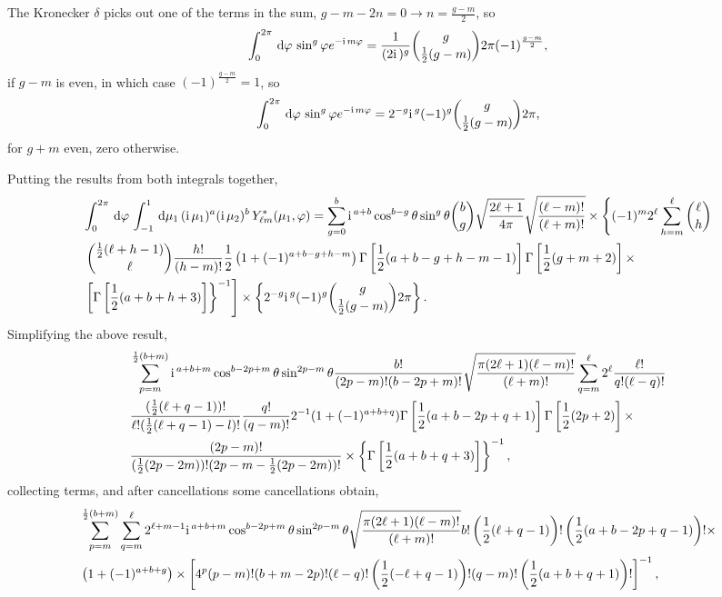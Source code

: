 The Kronecker \(\delta\) picks out one of the terms in the sum, \(g-m-2n=0 \to n = \frac{g-m}{2}\), so 
\begin{equation}
	\int_0^{2\pi} \,\mathrm{d}\varphi\, \sin^g \varphi e^{-\mathrm{i\,} m \varphi} = \frac{1}{(2 \mathrm{i\,} )^g} \binom{g}{\frac{1}{2}(g-m)} 2 \pi (-1)^{\frac{g-m}{2}},
\end{equation}
if \(g-m\) is even, in which case \((-1)^{\frac{g-m}{2}} = 1\), so
\begin{equation}
	\int_0^{2\pi} \,\mathrm{d}\varphi\, \sin^g \varphi e^{- \mathrm{i\,} m \varphi} = 2^{-g} \mathrm{i\,}^g (-1)^g \binom{g}{\frac{1}{2}(g-m)} 2 \pi, 
\end{equation}
for \(g+m \) even, zero otherwise. 

Putting the results from both integrals together, 
\begin{align}
	&\int_0^{2\pi} \,\mathrm{d}\varphi\, \int_{-1}^1 \,\mathrm{d}\mu_1\, (\mathrm{i\,} \mu_1)^a (\mathrm{i\,} \mu_2)^b \,Y_{\ell m}^*(\mu_1,\varphi) = \sum_{g=0}^b \mathrm{i\,}^{a+b} \cos^{b-g}\theta \sin^g\theta \binom{b}{g} \sqrt{\frac{2\ell+1}{4 \pi}} \sqrt{\frac{(\ell-m)!}{(\ell+m)!}} \times \left\{(-1)^m 2^\ell \sum_{h=m}^\ell \binom{\ell}{h} \right. \nonumber \\
	&\left. \binom{\frac{1}{2}(\ell+h-1)}{\ell} \frac{h!}{(h-m)!}  \frac{1}{2} \left(1+ (-1)^{a+b-g+h-m}\right) \Gamma\left[\frac{1}{2}(a+b-g+h-m-1)\right] \Gamma\left[\frac{1}{2} (g+m+2)\right]  \times \right. \nonumber \\
	&\left.  \left[\Gamma\left[\frac{1}{2} (a+b+h+3)\right] \right\}^{-1} \right]\times \left\{  2^{-g} \mathrm{i\,}^g (-1)^g \binom{g}{\frac{1}{2}(g-m)} 2 \pi\right\}.
\end{align}
Simplifying the above result,
\begin{align}
	&\sum_{p=m}^{\frac{1}{2}(b+m)} \mathrm{i\,}^{a+b+m} \cos^{b-2p+m}\theta \sin^{2p-m}\theta \frac{b!}{(2p-m)! (b-2p+m)!} \sqrt{\frac{\pi (2\ell+1) (\ell-m)!}{(\ell+m)!}} \sum_{q=m}^\ell 2^\ell \frac{\ell!}{q! (\ell-q)!} \nonumber \\
	& \frac{(\frac{1}{2}(\ell+q-1))!}{\ell!(\frac{1}{2}(\ell+q-1)-l)!} \frac{q!}{(q-m)!} 2^{-1} (1+(-1)^{a+b+q}) \Gamma\left[\frac{1}{2} (a+b-2p+q+1)\right] \Gamma\left[\frac{1}{2}(2p+2)\right]\times \nonumber \\
	& \frac{(2p-m)!}{(\frac{1}{2}(2p-2m))! (2p-m - \frac{1}{2}(2p-2m))!} \times \left\{ \Gamma\left[\frac{1}{2}(a+b+q+3)\right] \right\}^{-1},
\end{align}
collecting terms, and after cancellations some cancellations obtain, 
\begin{align}
	&\sum_{p=m}^{\frac{1}{2}(b+m)} \sum_{q=m}^\ell 2^{\ell+m-1} \mathrm{i\,}^{a+b+m} \cos^{b-2p+m}\theta \sin^{2p-m}\theta  \sqrt{\frac{\pi (2\ell+1) (\ell-m)!}{(\ell+m)!}} b! \left(\frac{1}{2}(\ell+q-1)\right)! \left(\frac{1}{2}(a+b-2p+q-1)\right)! \times \nonumber \\
	& \left(1+(-1)^{a+b+g}\right) \times \left[ 4^p (p-m)! (b+m-2p)! (\ell-q)! \left(\frac{1}{2}(-\ell+q-1)\right)! (q-m)! \left(\frac{1}{2}(a+b+q+1)\right)! \right]^{-1},
\end{align}
